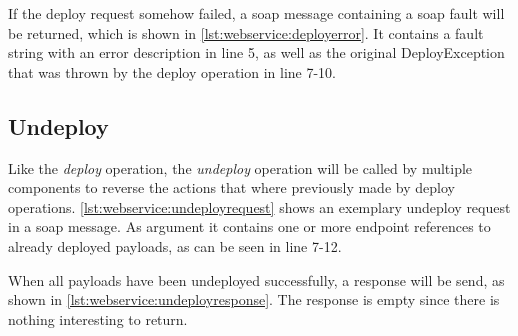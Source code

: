 If the deploy request somehow failed, a soap message containing a soap fault will be returned, which is shown in \autoref{lst:webservice:deployerror}.
It contains a fault string with an error description in line 5, as well as the original DeployException that was thrown by the deploy operation in line 7-10.

\vspace*{\baselineskip}

\subsection{Undeploy}

Like the \textit{deploy} operation, the \textit{undeploy} operation will be called by multiple components to reverse the actions that where previously made by deploy operations.
\autoref{lst:webservice:undeployrequest} shows an exemplary undeploy request in a soap message.
As argument it contains one or more endpoint references to already deployed payloads, as can be seen in line 7-12.

\vspace*{\baselineskip}

When all payloads have been undeployed successfully, a response will be send, as shown in \autoref{lst:webservice:undeployresponse}.
The response is empty since there is nothing interesting to return.

\vspace*{\baselineskip}

